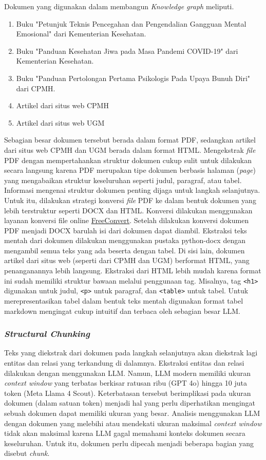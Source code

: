Dokumen yang digunakan dalam membangun \textit{Knowledge graph} meliputi.
\begin{enumerate}
	\item Buku "Petunjuk Teknis Pencegahan dan Pengendalian Gangguan Mental Emosional" dari Kementerian Kesehatan.
	\item Buku "Panduan Kesehatan Jiwa pada Masa Pandemi COVID-19" dari Kementerian Kesehatan.
	\item Buku "Panduan Pertolongan Pertama Psikologis Pada Upaya Bunuh Diri" dari CPMH.
	\item Artikel dari situs web CPMH
	\item Artikel dari situs web UGM
\end{enumerate}
Sebagian besar dokumen tersebut berada dalam format PDF, sedangkan artikel dari situs web CPMH dan UGM berada dalam format HTML.
Mengekstrak \textit{file} PDF dengan mempertahankan struktur dokumen cukup sulit untuk dilakukan secara langsung karena PDF merupakan tipe dokumen berbasis halaman (\textit{page}) yang mengabaikan struktur keseluruhan seperti judul, paragraf, atau tabel.
Informasi mengenai struktur dokumen penting dijaga untuk langkah selanjutnya.
Untuk itu, dilakukan strategi konversi \textit{file} PDF ke dalam bentuk dokumen yang lebih terstruktur seperti DOCX dan HTML.
Konversi dilakukan menggunakan layanan konversi file online \href{https://www.freeconvert.com/}{FreeConvert}.
Setelah dilakukan konversi dokumen PDF menjadi DOCX barulah isi dari dokumen dapat diambil.
Ekstraksi teks mentah dari dokumen dilakukan menggunakan pustaka python-docx dengan mengambil semua teks yang ada beserta dengan tabel.
Di sisi lain, dokumen artikel dari situs web (seperti dari CPMH dan UGM) berformat HTML, yang penanganannya lebih langsung.
Ekstraksi dari HTML lebih mudah karena format ini sudah memiliki struktur bawaan melalui penggunaan tag.
Misalnya, tag \texttt{<h1>} digunakan untuk judul, \texttt{<p>} untuk paragraf, dan \texttt{<table>} untuk tabel.
Untuk merepresentasikan tabel dalam bentuk teks mentah digunakan format tabel markdown mengingat cukup intuitif dan terbaca oleh sebagian besar LLM.

\subsubsection{\textit{Structural Chunking}}
Teks yang diekstrak dari dokumen pada langkah selanjutnya akan diekstrak lagi entitas dan relasi yang terkandung di dalamnya.
Ekstraksi entitas dan relasi dilakukan dengan menggunakan LLM.
Namun, LLM modern memiliki ukuran \textit{context window} yang terbatas berkisar ratusan ribu (GPT 4o) hingga 10 juta token (Meta Llama 4 Scout).
Keterbatasan tersebut berimplikasi pada ukuran dokumen (dalam satuan token) menjadi hal yang perlu diperhatikan mengingat sebuah dokumen dapat memiliki ukuran yang besar.
Analisis menggunakan LLM dengan dokumen yang melebihi atau mendekati ukuran maksimal \textit{context window} tidak akan maksimal karena LLM gagal memahami konteks dokumen secara keseluruhan.
Untuk itu, dokumen perlu dipecah menjadi beberapa bagian yang disebut \textit{chunk}.

